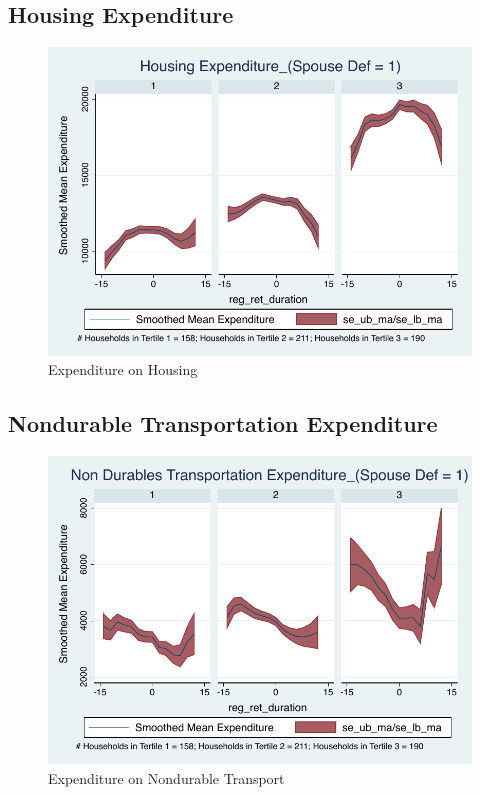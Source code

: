 \documentclass[a4paper]{article}
\begin{document}
\subsection{Housing Expenditure}
\begin{table}[h]
	\centering
	
\end{table}

\begin{figure}[h]
	\caption{Expenditure on Housing}
	\centering
	\includegraphics[width=1.0\textwidth]{../ConsumptionPostRetirement_by_SpouseDef_Cats/Smoothed/1/spouse_def_total_housing_real.pdf}
\end{figure}
\clearpage

\subsection{Nondurable Transportation Expenditure}
\begin{table}[h]
	\centering
	
\end{table}

\begin{figure}[h]
	\caption{Expenditure on Nondurable Transport}
	\centering
	\includegraphics[width=1.0\textwidth]{../ConsumptionPostRetirement_by_SpouseDef_Cats/Smoothed/1/spouse_def_total_transport_real.pdf}
\end{figure}
\clearpage
\end{document}
